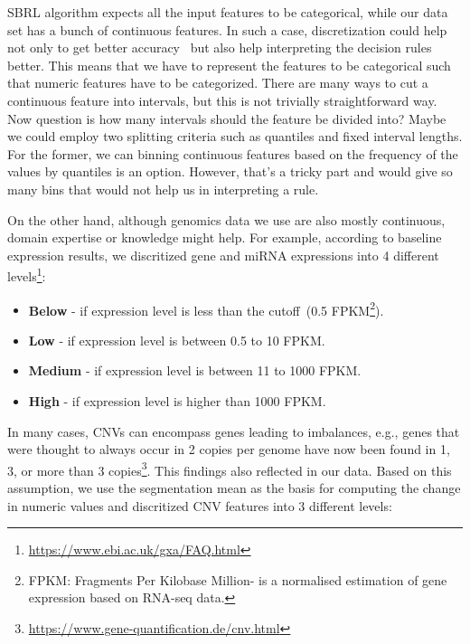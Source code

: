 \hspace*{3.5mm} SBRL algorithm expects all the input features to be categorical, while our data set has a bunch of continuous features. In such a case, discretization could help not only to get better accuracy~\cite{maslove2013discretization} but also help interpreting the decision rules better. This means that we have to represent the features to be categorical such that numeric features have to be categorized. There are many ways to cut a continuous feature into intervals, but this is not trivially straightforward way. Now question is how many intervals should the feature be divided into? Maybe we could employ two splitting criteria such as quantiles and fixed interval lengths. For the former, we can binning continuous features based on the frequency of the values by quantiles is an option. However, that's a tricky part and would give so many bins that would not help us in interpreting a rule. 

\hspace*{3.5mm} On the other hand, although genomics data we use are also mostly continuous, domain expertise or knowledge might help. For example, according to baseline expression results, we discritized gene and miRNA expressions into 4 different levels\footnote{\url{https://www.ebi.ac.uk/gxa/FAQ.html}}:

\vspace{-2mm}
\begin{itemize}[noitemsep]
    \item \textbf{Below} - if expression level is less than the cutoff~(0.5 FPKM\footnote{FPKM: Fragments Per Kilobase Million- is a normalised estimation of gene expression based on RNA-seq data.}).
    \item \textbf{Low} - if expression level is between 0.5 to 10 FPKM.
    \item \textbf{Medium} - if expression level is between 11 to 1000 FPKM. 
    \item \textbf{High} - if expression level is higher than 1000 FPKM. 
\end{itemize}

\hspace*{3.5mm} In many cases, CNVs can encompass genes leading to imbalances, e.g., genes that were thought to always occur in 2 copies per genome have now been found in 1, 3, or more than 3  copies\footnote{\url{https://www.gene-quantification.de/cnv.html}}. This findings also reflected in our data. Based on this assumption, we use the segmentation mean as the basis for computing the change in numeric values and discritized CNV features into 3 different levels:  

